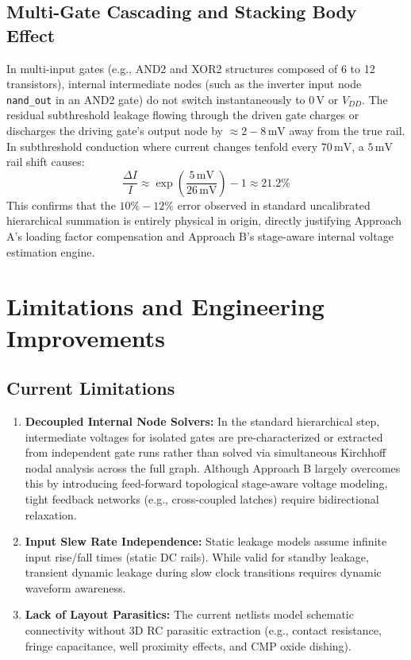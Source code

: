 \documentclass[11pt,a4paper]{article}
\begin{document}
\subsection{Multi-Gate Cascading and Stacking Body Effect}
In multi-input gates (e.g., AND2 and XOR2 structures composed of 6 to 12 transistors), internal intermediate nodes (such as the inverter input node \texttt{nand\_out} in an AND2 gate) do not switch instantaneously to $0\,\text{V}$ or $V_{DD}$. The residual subthreshold leakage flowing through the driven gate charges or discharges the driving gate's output node by $\approx 2-8\,\text{mV}$ away from the true rail. In subthreshold conduction where current changes tenfold every $70\,\text{mV}$, a $5\,\text{mV}$ rail shift causes:
\begin{equation}
    \frac{\Delta I}{I} \approx \exp\left(\frac{5\,\text{mV}}{26\,\text{mV}}\right) - 1 \approx 21.2\%
\end{equation}
This confirms that the $10\%-12\%$ error observed in standard uncalibrated hierarchical summation is entirely physical in origin, directly justifying Approach A's loading factor compensation and Approach B's stage-aware internal voltage estimation engine.

\section{Limitations and Engineering Improvements}
\subsection{Current Limitations}
\begin{enumerate}
    \item \textbf{Decoupled Internal Node Solvers:} In the standard hierarchical step, intermediate voltages for isolated gates are pre-characterized or extracted from independent gate runs rather than solved via simultaneous Kirchhoff nodal analysis across the full graph. Although Approach B largely overcomes this by introducing feed-forward topological stage-aware voltage modeling, tight feedback networks (e.g., cross-coupled latches) require bidirectional relaxation.
    \item \textbf{Input Slew Rate Independence:} Static leakage models assume infinite input rise/fall times (static DC rails). While valid for standby leakage, transient dynamic leakage during slow clock transitions requires dynamic waveform awareness.
    \item \textbf{Lack of Layout Parasitics:} The current netlists model schematic connectivity without 3D RC parasitic extraction (e.g., contact resistance, fringe capacitance, well proximity effects, and CMP oxide dishing).
\end{enumerate}
\end{document}
